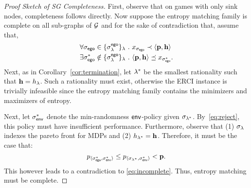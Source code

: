 \begin{proof}[Proof Sketch of SG Completeness]
  First, observe that on games with only sink nodes, completeness
  follows directly.
  Now suppose the entropy matching family is
  complete on all sub-graphs of $\mathcal{G}$ and for the sake of
  contradiction that, assume that,
  \begin{align}
    &\forall \sched_\pOne \in \{\sched^{\pOne}_\rat\}_\rat~.~ x_{\sched_{\pOne}} \prec \langle \scthreshold, \randomness \rangle\label{eq:reject}\\
    &\exists \sched_\pOne^* \notin \{\sched^{\pOne}_\rat\}_\rat~.~  \langle \scthreshold, \randomness \rangle \preceq x_{\sched_{\pOne}^*}\label{eq:incomplete}.
  \end{align}
  Next, as in Corollary~\ref{cor:termination}, let $\lambda^*$ be the smallest
  rationality such that $\mathbf{h} = h_\lambda$. Such a rationality must
  exist, otherwise the ERCI instance is trivially infeasible since the
  entropy matching family contains the minimizers and maximizers of entropy.


  Next, let
  $\sigma_{\mathsf{env}}^*$ denote the min-randomness $\mathsf{env}$-policy given
  $\sigma_{\lambda^*}$. By~\eqref{eq:reject}, this policy must have
  insufficient performance.
  Furthermore, observe that  (1) $\sigma_\lambda$ indexes the pareto front for MDPs and (2) $h_{\lambda^*} = \mathbf{h}$. Therefore, it must be
  the case that:
  \begin{equation}
    p_{\langle \sigma_{\mathsf{ego}}^*, \sigma_{\mathsf{env}}^* \rangle} \leq p_{\langle \sigma_{\lambda^*}, \sigma_{\mathsf{env}}^* \rangle} < \mathbf{p}.
  \end{equation}
  This however leads to a contradiction to \eqref{eq:incomplete}.  Thus,
  entropy matching must be complete.
\end{proof}

